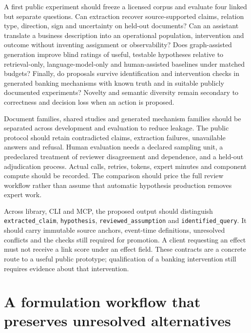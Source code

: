 A first public experiment should freeze a licensed corpus and evaluate four linked but separate questions. Can extraction recover source-supported claims, relation type, direction, sign and uncertainty on held-out documents? Can an assistant translate a business description into an operational population, intervention and outcome without inventing assignment or observability? Does graph-assisted generation improve blind ratings of useful, testable hypotheses relative to retrieval-only, language-model-only and human-assisted baselines under matched budgets? Finally, do proposals survive identification and intervention checks in generated banking mechanisms with known truth and in suitable publicly documented experiments? Novelty and semantic diversity remain secondary to correctness and decision loss when an action is proposed.

Document families, shared studies and generated mechanism families should be separated across development and evaluation to reduce leakage. The public protocol should retain contradicted claims, extraction failures, unavailable answers and refusal. Human evaluation needs a declared sampling unit, a predeclared treatment of reviewer disagreement and dependence, and a held-out adjudication process. Actual calls, retries, tokens, expert minutes and component compute should be recorded. The comparison should price the full review workflow rather than assume that automatic hypothesis production removes expert work.

Across library, CLI and MCP, the proposed output should distinguish \texttt{extracted\_claim}, \texttt{hypothesis}, \texttt{reviewed\_assumption} and \texttt{identified\_query}. It should carry immutable source anchors, event-time definitions, unresolved conflicts and the checks still required for promotion. A client requesting an effect must not receive a link score under an effect field. These contracts are a concrete route to a useful public prototype; qualification of a banking intervention still requires evidence about that intervention.



\hypertarget{a-formulation-workflow-that-preserves-unresolved-alternatives}{%
\section{A formulation workflow that preserves unresolved
alternatives}\label{a-formulation-workflow-that-preserves-unresolved-alternatives}}

